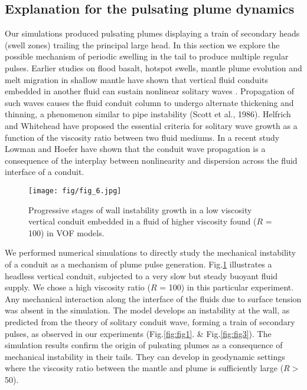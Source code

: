 \documentclass[12pt]{article}
\begin{document}
{\subsection{Explanation for the pulsating plume dynamics}
\label{sec:pulsating} 



Our simulations produced pulsating plumes displaying a train of secondary heads (swell zones) trailing the principal large head. In this section we explore the possible mechanism of periodic swelling in the tail to produce multiple regular pulses. Earlier studies on flood basalt, hotspot swells, mantle plume evolution and melt migration in shallow mantle have shown that vertical fluid conduits embedded in another fluid can sustain nonlinear solitary waves \cite{scott1986observations, olson1986solitary, schubert1989solitary, helfrich1990solitary}. Propagation of such waves causes the fluid conduit column to undergo alternate thickening and thinning, a phenomenon similar to pipe instability (Scott et al., 1986).  Helfrich and Whitehead \cite{helfrich1990solitary} have proposed the essential criteria for solitary wave growth as a function of the viscosity ratio between two fluid mediums. In a recent study 
Lowman and Hoefer \cite{lowman2013dispersive} have shown that the conduit wave propagation is a consequence of the interplay between nonlinearity and dispersion across the fluid interface of a conduit. 
\cite{lowman2013dispersive}
\begin{figure}[!htb]
 \begin{center}
{\texttt{[image: fig/fig\_6.jpg]} }
\caption{\small {Progressive stages of wall instability growth in a low viscosity vertical conduit embedded in a fluid of higher viscosity found ($R$ = 100) in VOF models.  }}
\label{fig:fig6}
 \end{center}
\end{figure}

We performed numerical simulations to directly study the mechanical instability of a conduit as a mechanism of plume pulse generation. Fig.\ref{fig:fig6} illustrates a headless vertical conduit, subjected to a very slow but steady buoyant fluid supply. We chose a high viscosity ratio ($R$ = 100) in this particular experiment. Any mechanical interaction along the interface of the fluids due to surface tension was absent in the simulation. The model develops an instability at the wall, as predicted from the theory of solitary conduit wave, forming a train of secondary pulses, as observed in our experiments (Fig.\ref{fig:fig1}. \& Fig.\ref{fig:fig3}). The simulation results confirm the origin of pulsating plumes as a consequence of mechanical instability in their tails. They can develop in geodynamic settings where the viscosity ratio between the mantle and plume is sufficiently large ($R>$ 50).






}
\end{document}
